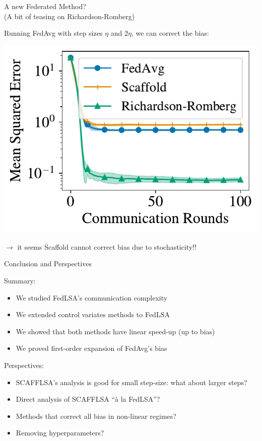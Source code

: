 \documentclass[aspectratio=169,14pt]{beamer}
\begin{document}
  \begin{frame}{A new Federated Method?\\[-0.5em]
    \small (A bit of teasing on Richardson-Romberg)}
    \vspace{-1em}
    
    Running FedAvg with step sizes $\eta$ and $2 \eta$, we can correct the bias:

    \vspace{-1em}
    
    \begin{center}
      \includegraphics[width=0.5\linewidth]{images/heterogeneous_mixed_100.pdf}
    \end{center}

    \vspace{-1.5em}

    $\rightarrow$ it seems Scaffold cannot correct bias due to stochasticity!!

  \end{frame}
  
  \begin{frame}{Conclusion and Perspectives}

    \vspace{-1em}
        
    Summary:

    \vspace{-0.5em}

    \begin{itemize}
    \small      
    \item We studied FedLSA's communication complexity
    \item We extended control variates methods to FedLSA
    \item We showed that both methods have linear speed-up (up to bias)
    \item We proved first-order expansion of FedAvg's bias
    \end{itemize}

    Perspectives:

    \vspace{-0.5em}
    
    \begin{itemize}
    \small
    \item SCAFFLSA's analysis is good for small step-size: what about larger steps?
    \item Direct analysis of SCAFFLSA ``à la FedLSA''?
    \item Methods that correct all bias in non-linear regimes?
    \item Removing hyperparameters?
    \end{itemize}
  \end{frame}
\end{document}
